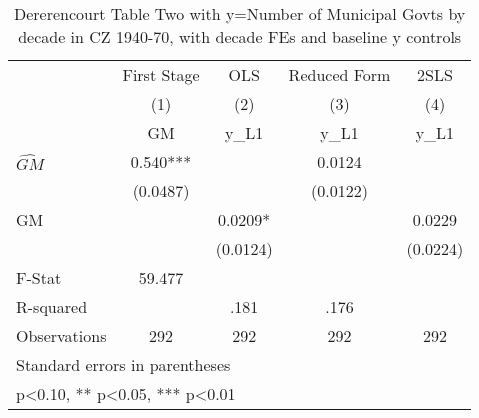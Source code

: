 \begin{table}[htbp]\centering
\def\sym#1{\ifmmode^{#1}\else\(^{#1}\)\fi}
\caption{Dererencourt Table Two with y=Number of Municipal Govts by decade in CZ 1940-70, with decade FEs and baseline y controls}
\begin{tabular}{l*{4}{c}}
\toprule
                    & First Stage   &         OLS   &Reduced Form   &        2SLS   \\
                    &\multicolumn{1}{c}{(1)}&\multicolumn{1}{c}{(2)}&\multicolumn{1}{c}{(3)}&\multicolumn{1}{c}{(4)}\\
                    &\multicolumn{1}{c}{GM}&\multicolumn{1}{c}{y\_L1}&\multicolumn{1}{c}{y\_L1}&\multicolumn{1}{c}{y\_L1}\\
\midrule
$\hat{GM}$          &       0.540***&               &      0.0124   &               \\
                    &    (0.0487)   &               &    (0.0122)   &               \\
\addlinespace
GM                  &               &      0.0209*  &               &      0.0229   \\
                    &               &    (0.0124)   &               &    (0.0224)   \\
\midrule
F-Stat              &      59.477   &               &               &               \\
R-squared           &               &        .181   &        .176   &               \\
Observations        &         292   &         292   &         292   &         292   \\
\bottomrule
\multicolumn{5}{l}{\footnotesize Standard errors in parentheses}\\
\multicolumn{5}{l}{\footnotesize * p<0.10, ** p<0.05, *** p<0.01}\\
\end{tabular}
\end{table}
